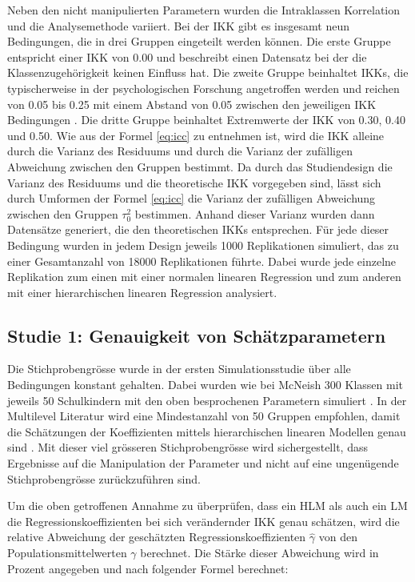 \documentclass[12pt, a4paper]{article}\usepackage[]{graphicx}\usepackage[]{color}
\begin{document}
Neben den nicht manipulierten Parametern wurden die Intraklassen Korrelation und die Analysemethode variiert. Bei der IKK gibt es insgesamt neun Bedingungen, die in drei Gruppen eingeteilt werden können. Die erste Gruppe entspricht einer IKK von 0.00 und beschreibt einen Datensatz bei der die Klassenzugehörigkeit keinen Einfluss hat. Die zweite Gruppe beinhaltet IKKs, die typischerweise in der psychologischen Forschung angetroffen werden und reichen von 0.05 bis 0.25 mit einem Abstand von 0.05 zwischen den jeweiligen IKK Bedingungen \citep{hedges&hedberg:2007, SnijdersTomA.B2012Ma:a}. Die dritte Gruppe beinhaltet Extremwerte der IKK von 0.30, 0.40 und 0.50. Wie aus der Formel \eqref{eq:icc} zu entnehmen ist, wird die IKK alleine durch die Varianz des Residuums und durch die Varianz der zufälligen Abweichung zwischen den Gruppen bestimmt. Da durch das Studiendesign die Varianz des Residuums und die theoretische IKK vorgegeben sind, lässt sich durch Umformen der Formel \eqref{eq:icc} die Varianz der zufälligen Abweichung zwischen den Gruppen $\tau^{2}_{0}$ bestimmen. Anhand dieser Varianz wurden dann Datensätze generiert, die den theoretischen IKKs entsprechen. Für jede dieser Bedingung wurden in jedem Design jeweils 1000 Replikationen simuliert, das zu einer Gesamtanzahl von 18000 Replikationen führte. Dabei wurde jede einzelne Replikation zum einen mit einer normalen linearen Regression und zum anderen mit einer hierarchischen linearen Regression analysiert. 

\subsection{Studie 1: Genauigkeit von Schätzparametern}
Die Stichprobengrösse wurde in der ersten Simulationsstudie über alle Bedingungen konstant gehalten. Dabei wurden wie bei McNeish 300 Klassen mit jeweils 50 Schulkindern mit den oben besprochenen Parametern simuliert \citeyearpar{mcneish2014analyzing}. In der Multilevel Literatur wird eine Mindestanzahl von 50 Gruppen empfohlen, damit die Schätzungen der Koeffizienten mittels hierarchischen linearen Modellen genau sind \citep{maashox2005samplesize}. Mit dieser viel grösseren Stichprobengrösse wird sichergestellt, dass Ergebnisse auf die Manipulation der Parameter und nicht auf eine ungenügende Stichprobengrösse zurückzuführen sind.

Um die oben getroffenen Annahme zu überprüfen, dass ein HLM als auch ein LM die Regressionskoeffizienten bei sich verändernder IKK genau schätzen, wird die relative Abweichung der geschätzten Regressionskoeffizienten $\widehat{\gamma}$ von den Populationsmittelwerten $\gamma$ berechnet. Die Stärke dieser Abweichung wird in Prozent angegeben \citep{hooglandboosma1998robustness} und nach folgender Formel berechnet: 
\end{document}
